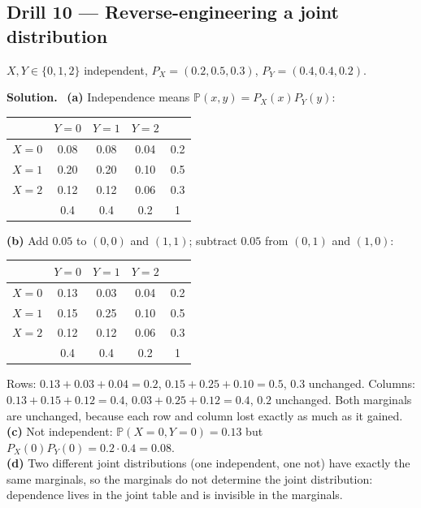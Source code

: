 \documentclass[11pt]{article}
\renewcommand{\P}{\mathbb{P}}
\newenvironment{soln}{\par\smallskip\noindent\textbf{Solution.}\ }{\par\medskip}
\begin{document}
\subsection*{Drill 10 --- Reverse-engineering a joint distribution}
$X,Y\in\{0,1,2\}$ independent, $P_X=(0.2,0.5,0.3)$, $P_Y=(0.4,0.4,0.2)$.
\begin{soln}
\textbf{(a)} Independence means $\P(x,y)=P_X(x)P_Y(y)$:
\begin{center}
\begin{tabular}{c|ccc|c}
 & $Y=0$ & $Y=1$ & $Y=2$ &\\\hline
$X=0$ & 0.08 & 0.08 & 0.04 & 0.2\\
$X=1$ & 0.20 & 0.20 & 0.10 & 0.5\\
$X=2$ & 0.12 & 0.12 & 0.06 & 0.3\\\hline
 & 0.4 & 0.4 & 0.2 & 1
\end{tabular}
\end{center}
\textbf{(b)} Add $0.05$ to $(0,0)$ and $(1,1)$; subtract $0.05$ from $(0,1)$ and $(1,0)$:
\begin{center}
\begin{tabular}{c|ccc|c}
 & $Y=0$ & $Y=1$ & $Y=2$ &\\\hline
$X=0$ & 0.13 & 0.03 & 0.04 & 0.2\\
$X=1$ & 0.15 & 0.25 & 0.10 & 0.5\\
$X=2$ & 0.12 & 0.12 & 0.06 & 0.3\\\hline
 & 0.4 & 0.4 & 0.2 & 1
\end{tabular}
\end{center}
Rows: $0.13+0.03+0.04=0.2$, $0.15+0.25+0.10=0.5$, $0.3$ unchanged. Columns: $0.13+0.15+0.12=0.4$, $0.03+0.25+0.12=0.4$, $0.2$ unchanged. Both marginals are unchanged, because each row and column lost exactly as much as it gained.\\
\textbf{(c)} Not independent: $\P(X{=}0,Y{=}0)=0.13$ but $P_X(0)P_Y(0)=0.2\cdot0.4=0.08$.\\
\textbf{(d)} Two different joint distributions (one independent, one not) have exactly the same marginals, so the marginals do not determine the joint distribution: dependence lives in the joint table and is invisible in the marginals.
\end{soln}
\end{document}
